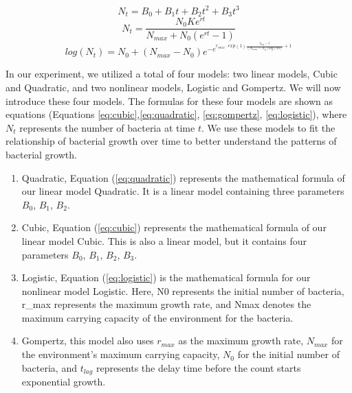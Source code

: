 \documentclass[11pt]{article}
\begin{document}
\begin{linenumbers}
            \begin{equation}
                N_t = B_0 + B_1 t + B_2 t^2 + B_3 t^3
                \label{eq:cubic}
            \end{equation}
            \begin{equation}
                N_t = \frac{N_0 K e^{rt}}{N_{max} + N_0 (e^{rt} - 1)}
                \label{eq:logistic}
            \end{equation}
            \begin{equation}
                log(N_t) = N_0 + (N_{max} - N_0) e^{-e^{r_{max} \cdot exp(1) \frac{t_{lag} - t}{(N_{max} - N_0) log(10)}+1}}
                \label{eq:gompertz}
            \end{equation}

            In our experiment, we utilized a total of four models: two linear models, Cubic and Quadratic, and two nonlinear models, Logistic and Gompertz. We will now introduce these four models. The formulas for these four models are shown as equations (Equations \ref{eq:cubic},\ref{eq:quadratic}, \ref{eq:gompertz}, \ref{eq:logistic}), where $N_t$ represents the number of bacteria at time $t$. We use these models to fit the relationship of bacterial growth over time to better understand the patterns of bacterial growth.
            \begin{enumerate}
                \item Quadratic, Equation (\ref{eq:quadratic}) represents the mathematical formula of our linear model Quadratic. It is a linear model containing three parameters $B_0$, $B_1$, $B_2$.
                \item Cubic, Equation (\ref{eq:cubic}) represents the mathematical formula of our linear model Cubic. This is also a linear model, but it contains four parameters $B_0$, $B_1$, $B_2$, $B_3$.
                \item Logistic, Equation (\ref{eq:logistic}) is the mathematical formula for our nonlinear model Logistic. Here, N0 represents the initial number of bacteria, r\_max represents the maximum growth rate, and Nmax denotes the maximum carrying capacity of the environment for the bacteria.
                \item Gompertz, this model also uses $r_{max}$ as the maximum growth rate, $N_{max}$ for the environment's maximum carrying capacity, $N_0$ for the initial number of bacteria, and $t_{lag}$ represents the delay time before the count starts exponential growth.
            \end{enumerate}

\end{linenumbers}
\end{document}
